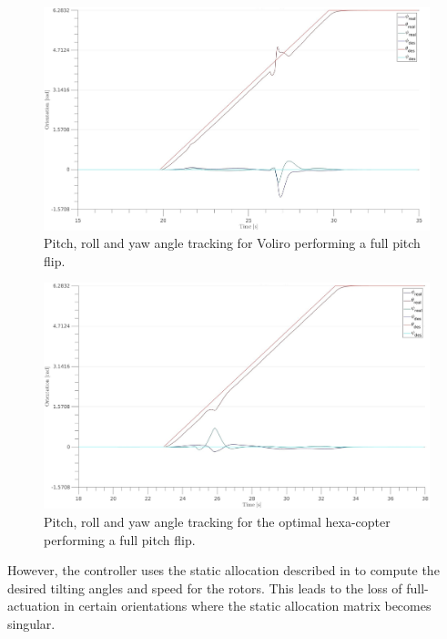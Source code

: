 \begin{figure}[!ht]
  \begin{center}
    \includegraphics[width=1.0\linewidth]{images/Voliro_pitch_angle.jpg}
    \caption{Pitch, roll and yaw angle tracking for Voliro performing a full pitch flip.}
    \label{fig:Voliro_angle_pitch}
  \end{center}
\end{figure}

\begin{figure}[!ht]
  \begin{center}
    \includegraphics[width=1.0\linewidth]{images/Hexa_pitch_angle.jpg}
    \caption{Pitch, roll and yaw angle tracking for the optimal hexa-copter performing a full pitch flip.}
    \label{fig:Hexa_angle_pitch}
  \end{center}
\end{figure}

However, the controller uses
the static allocation described in  to compute the desired
tilting angles and speed for the rotors. This leads to the loss of full-actuation in
certain orientations where the static allocation matrix becomes singular.

